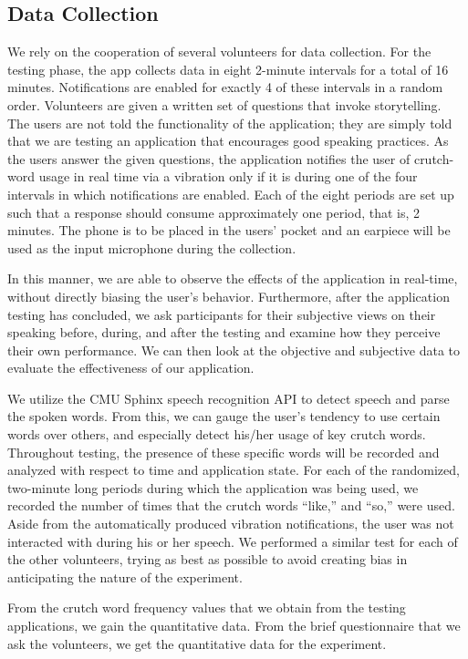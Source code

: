 \documentclass{sigchi}
\begin{document}
\subsection{Data Collection}

We rely on the cooperation of several volunteers for data collection. For the testing phase, the app collects data in eight 2-minute intervals for a total of 16 minutes. Notifications are enabled for exactly 4 of these intervals in a random order. Volunteers are given a written set of questions that invoke storytelling. The users are not told the functionality of the application; they are simply told that we are testing an application that encourages good speaking practices. As the users answer the given questions, the application notifies the user of crutch-word usage in real time via a vibration only if it is during one of the four intervals in which notifications are enabled. Each of the eight periods are set up such that a response should consume approximately one period, that is, 2 minutes. The phone is to be placed in the users' pocket and an earpiece will be used as the input microphone during the collection.

In this manner, we are able to observe the effects of the application in real-time, without directly biasing the user’s behavior. Furthermore, after the application testing has concluded, we ask participants for their subjective views on their speaking before, during, and after the testing and examine how they perceive their own performance. We can then look at the objective and subjective data to evaluate the effectiveness of our application.

We utilize the CMU Sphinx speech recognition API to detect speech and parse the spoken words. From this, we can gauge the user’s tendency to use certain words over others, and especially detect his/her usage of key crutch words. Throughout testing, the presence of these specific words will be recorded and analyzed with respect to time and application state.  For each of the randomized, two-minute long periods during which the application was being used, we recorded the number of times that the crutch words “like,” and “so,” were used. Aside from the automatically produced vibration notifications, the user was not interacted with during his or her speech. We performed a similar test for each of the other volunteers, trying as best as possible to avoid creating bias in anticipating the nature of the experiment.

From the crutch word frequency values that we obtain from the testing applications, we gain the quantitative data. From the brief questionnaire that we ask the volunteers, we get the quantitative data for the experiment. 
\end{document}

